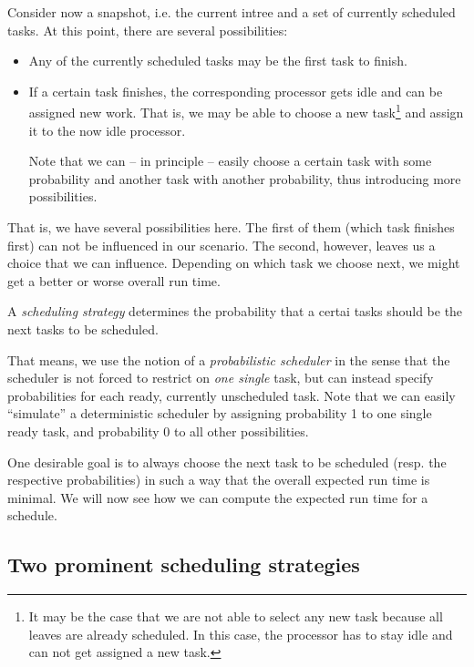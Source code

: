 Consider now a snapshot, i.e. the current intree and a set of currently scheduled tasks. At this point, there are several possibilities:

\begin{itemize}
\item Any of the currently scheduled tasks may be the first task to finish.
\item If a certain task finishes, the corresponding processor gets idle and can be assigned new work. That is, we may be able to choose a new task\footnote{It may be the case that we are not able to select any new task because all leaves are already scheduled. In this case, the processor has to stay idle and can not get assigned a new task.} and assign it to the now idle processor.

  Note that we can -- in principle -- easily choose a certain task with some probability and another task with another probability, thus introducing more possibilities.
\end{itemize}

That is, we have several possibilities here. The first of them (which task finishes first) can not be influenced in our scenario. The second, however, leaves us a choice that we can influence. Depending on which task we choose next, we might get a better or worse overall run time.

\begin{definition}
  A \emph{scheduling strategy} determines the probability that a certai tasks should be the next tasks to be scheduled.
\end{definition}

That means, we use the notion of a \emph{probabilistic scheduler} in the sense that the scheduler is not forced to restrict on \emph{one single} task, but can instead specify probabilities for each ready, currently unscheduled task. Note that we can easily ``simulate'' a deterministic scheduler by assigning probability 1 to one single ready task, and probability 0 to all other possibilities.

One desirable goal is to always choose the next task to be scheduled (resp. the respective probabilities) in such a way that the overall expected run time is minimal. We will now see how we can compute the expected run time for a schedule.

\subsection{Two prominent scheduling strategies}
\label{sec:intro-two-scheduling-strategies}

